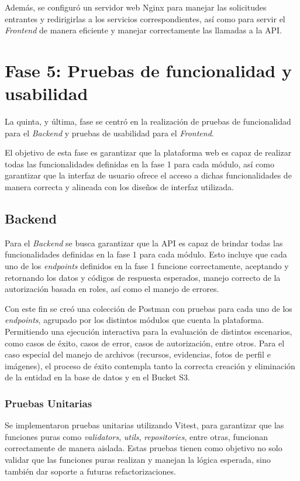 Además, se configuró un servidor web Nginx para manejar las solicitudes entrantes y redirigirlas a los servicios correspondientes, así
como para servir el \textit{Frontend} de manera eficiente y manejar correctamente las llamadas a la API.

\section{Fase 5: Pruebas de funcionalidad y usabilidad}
La quinta, y última, fase se centró en la realización de pruebas de funcionalidad para el \textit{Backend} y pruebas de usabilidad 
para el \textit{Frontend}.

El objetivo de esta fase es garantizar que la plataforma web es capaz de realizar todas las funcionalidades definidas en la fase 1
para cada módulo, así como garantizar que la interfaz de usuario ofrece el acceso a dichas funcionalidades de manera correcta
y alineada con los diseños de interfaz utilizada.

\subsection{Backend}
Para el \textit{Backend} se busca garantizar que la API es capaz de brindar todas las funcionalidades definidas en la fase 1 para cada
módulo. Esto incluye que cada uno de los \textit{endpoints} definidos en la fase 1 funcione correctamente, aceptando y retornando los
datos y códigos de respuesta esperados, manejo correcto de la autorización basada en roles, así como el manejo de errores.

Con este fin se creó una colección de Postman con pruebas para cada uno de los \textit{endpoints}, agrupado por los distintos módulos
que cuenta la plataforma. Permitiendo una ejecución interactiva para la evaluación de distintos escenarios, como casos de éxito, casos
de error, casos de autorización, entre otros.
Para el caso especial del manejo de archivos (recursos, evidencias, fotos de perfil e imágenes), el proceso de éxito contempla tanto
la correcta creación y eliminación de la entidad en la base de datos y en el Bucket S3.

\subsubsection{Pruebas Unitarias}
Se implementaron pruebas unitarias utilizando Vitest, para garantizar que las funciones puras como \textit{validators}, \textit{utils},
\textit{repositories}, entre otras, funcionan correctamente de manera aislada. Estas pruebas tienen como objetivo no solo validar que las
funciones puras realizan y manejan la lógica esperada, sino también dar soporte a futuras refactorizaciones.

